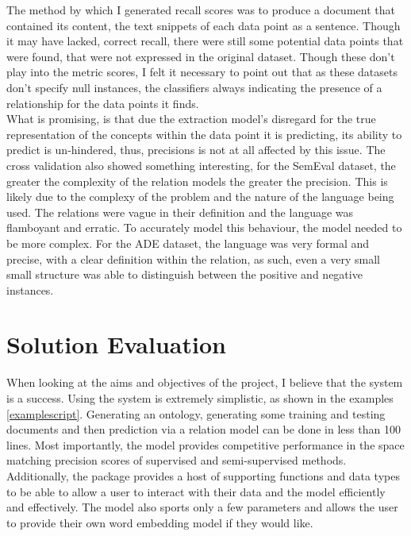 \documentclass[12pt]{article} %
\begin{document}
The method by which I generated recall scores was to produce a document that contained its content, the text snippets of each data point as a sentence. Though it may have lacked, correct recall, there were still some potential data points that were found, that were not expressed in the original dataset. Though these don’t play into the metric scores, I felt it necessary to point out that as these datasets don’t specify null instances, the classifiers always indicating the presence of a relationship for the data points it finds.\\

What is promising, is that due the extraction model’s disregard for the true representation of the concepts within the data point it is predicting, its ability to predict is un-hindered, thus, precisions is not at all affected by this issue. The cross validation also showed something interesting, for the SemEval dataset, the greater the complexity of the relation models the greater the precision. This is likely due to the complexy of the problem and the nature of the language being used. The relations were vague in their definition and the language was flamboyant and erratic. To accurately model this behaviour, the model needed to be more complex. For the ADE dataset, the language was very formal and precise, with a clear definition within the relation, as such, even a very small small structure was able to distinguish between the positive and negative instances.


\section{Solution Evaluation}

When looking at the aims and objectives of the project, I believe that the system is a success. Using the system is extremely simplistic, as shown in the examples \ref{examplescript}. Generating an ontology, generating some training and testing documents and then prediction via a relation model can be done in less than 100 lines. Most importantly, the model provides competitive performance in the space matching precision scores of supervised and semi-supervised methods. Additionally, the package provides a host of supporting functions and data types to be able to allow a user to interact with their data and the model efficiently and effectively. The model also sports only a few parameters and allows the user to provide their own word embedding model if they would like.\\
\end{document}
